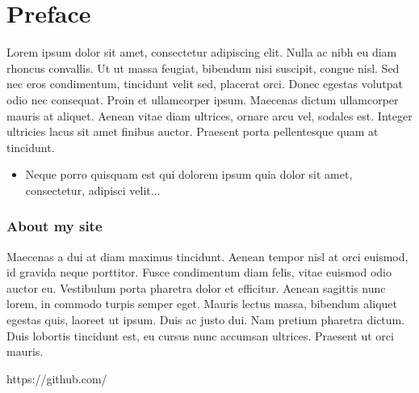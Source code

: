 \chapter{Preface}



Lorem ipsum dolor sit amet, consectetur adipiscing elit. Nulla ac nibh eu diam rhoncus convallis. Ut ut massa feugiat, bibendum nisi suscipit, congue nisl. Sed nec eros condimentum, tincidunt velit sed, placerat orci. Donec egestas volutpat odio nec consequat. Proin et ullamcorper ipsum. Maecenas dictum ullamcorper mauris at aliquet. Aenean vitae diam ultrices, ornare arcu vel, sodales est. Integer ultricies lacus sit amet finibus auctor. Praesent porta pellentesque quam at tincidunt. 


\begin{itemize}
\item Neque porro quisquam est qui dolorem ipsum quia dolor sit amet, consectetur, adipisci velit...
\end{itemize}

\subsection*{About my site}

Maecenas a dui at diam maximus tincidunt. Aenean tempor nisl at orci euismod, id gravida neque porttitor. Fusce condimentum diam felis, vitae euismod odio auctor eu. Vestibulum porta pharetra dolor et efficitur. Aenean sagittis nunc lorem, in commodo turpis semper eget. Mauris lectus massa, bibendum aliquet egestas quis, laoreet ut ipsum. Duis ac justo dui. Nam pretium pharetra dictum. Duis lobortis tincidunt est, eu cursus nunc accumsan ultrices. Praesent ut orci mauris. 
\begin{center}
    https://github.com/
\end{center}
